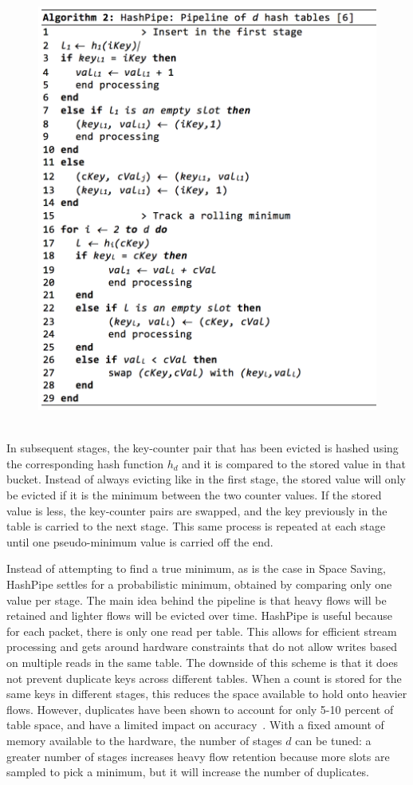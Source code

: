\begin{figure}[t]
  \centering
    \includegraphics[scale=0.42]{alg2}
     \label{fig:alg2}
\end{figure}
\\In subsequent stages, the key-counter pair that has been evicted is hashed using the corresponding hash function $h_d$ and it is compared to the stored value in that bucket. Instead of always evicting like in the first stage, the stored value will only be evicted if it is the minimum between the two counter values. If the stored value is less, the key-counter pairs are swapped, and the key previously in the table is carried to the next stage. This same process is repeated at each stage until one pseudo-minimum value is carried off the end.

Instead of attempting to find a true minimum, as is the case in Space Saving, HashPipe settles for a probabilistic minimum, obtained by comparing only one value per stage. The main idea behind the pipeline is that heavy flows will be retained and lighter flows will be evicted over time. HashPipe is useful because for each packet, there is only one read per table. This allows for efficient stream processing and gets around hardware constraints that do not allow writes based on multiple reads in the same table. The downside of this scheme is that it does not prevent duplicate keys across different tables. When a count is stored for the same keys in different stages, this reduces the space available to hold onto heavier flows. However, duplicates have been shown to account for only 5-10 percent of table space, and have a limited impact on accuracy~\cite{hashpipe}. With a fixed amount of memory available to the hardware, the number of stages $d$ can be tuned: a greater number of stages increases heavy flow retention because more slots are sampled to pick a minimum, but it will increase the number of duplicates.